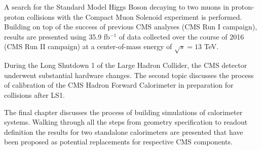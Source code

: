 A search for the Standard Model Higgs Boson decaying to two muons in proton-proton collisions with the Compact Muon Solenoid experiment is performed. Building on top of the success of previous CMS analyses (CMS Run I campaign), results are presented using 35.9 fb$^{-1}$ of data collected over the course of 2016 (CMS Run II campaign) at a center-of-mass energy of $\sqrt{s} = 13$ TeV.

During the Long Shutdown 1 of the Large Hadron Collider, the CMS detector underwent substantial hardware changes. The second topic discusses the process of calibration of the CMS Hadron Forward Calorimeter in preparation for collisions after LS1.

The final chapter discusses the process of building simulations of calorimeter systems. Walking through all the steps from geometry specification to readout definition the results for two standalone calorimeters are presented that have been proposed as potential replacements for respective CMS components.